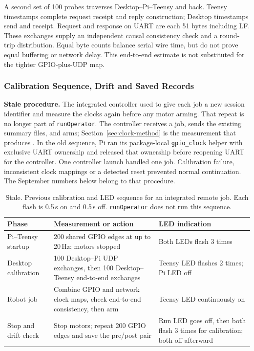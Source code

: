 A second set of 100 probes traverses Desktop--Pi--Teensy and back. Teensy timestamps complete request receipt and reply construction; Desktop timestamps send and receipt. Request and response on UART are each 51 bytes including LF. These exchanges supply an independent causal consistency check and a round-trip distribution. Equal byte counts balance serial wire time, but do not prove equal buffering or network delay. This end-to-end estimate is not substituted for the tighter GPIO-plus-UDP map.

\subsubsection{Calibration Sequence, Drift and Saved Records}

\textbf{Stale procedure.} The integrated controller used to give each job a new session identifier and measure the clocks again before any motor arming. That repeat is no longer part of \texttt{runOperator}. The controller receives a job, sends the existing summary files, and arms; Section~\ref{sec:clock-method} is the measurement that produces . In the old sequence, Pi ran its package-local \texttt{gpio\_clock} helper with exclusive UART ownership and released that ownership before reopening UART for the controller. One controller launch handled one job. Calibration failure, inconsistent clock mappings or a detected reset prevented normal continuation. The September numbers below belong to that procedure.

\begin{table}[H]
\centering\small
\caption{Stale. Previous calibration and LED sequence for an integrated remote job. Each flash is 0.5\,s on and 0.5\,s off. \texttt{runOperator} does not run this sequence.}
\begin{tabular}{@{}L{4.1cm}L{7.8cm}L{4.0cm}@{}}
\toprule
Phase & Measurement or action & LED indication \\
\midrule
Pi--Teensy startup & 200 shared GPIO edges at up to 20\,Hz; motors stopped & Both LEDs flash 3 times \\
Desktop calibration & 100 Desktop--Pi UDP exchanges, then 100 Desktop--Teensy end-to-end exchanges & Teensy LED flashes 2 times; Pi LED off \\
Robot job & Combine GPIO and network clock maps, check end-to-end consistency, then arm & Teensy LED continuously on \\
Stop and drift check & Stop motors; repeat 200 GPIO edges and save the pre/post pair & Run LED goes off, then both flash 3 times for calibration; both off afterward \\
\bottomrule
\end{tabular}
\end{table}

